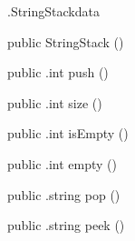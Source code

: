 \begin{CrexxClass}{.StringStack}{data}

  \begin{Hierarchy}
  \end{Hierarchy}

  \begin{Members}

    \Factory
      {public}
      {StringStack}
      {()}

    \Method
      {public}
      {.int}
      {push}
      {()}

    \Method
      {public}
      {.int}
      {size}
      {()}

    \Method
      {public}
      {.int}
      {isEmpty}
      {()}

    \Method
      {public}
      {.int}
      {empty}
      {()}

    \Method
      {public}
      {.string}
      {pop}
      {()}

    \Method
      {public}
      {.string}
      {peek}
      {()}

  \end{Members}
\end{CrexxClass}


